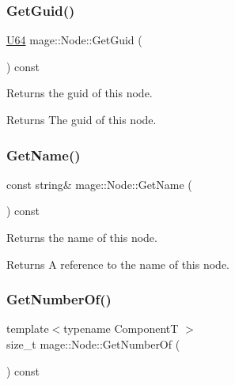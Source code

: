 \subsubsection{\texorpdfstring{Get\+Guid()}{GetGuid()}}
{\footnotesize\ttfamily \hyperlink{namespacemage_a6672cf3c861707ce4a3235a3eb43941d}{U64} mage\+::\+Node\+::\+Get\+Guid (\begin{DoxyParamCaption}{ }\end{DoxyParamCaption}) const\hspace{0.3cm}{\ttfamily [noexcept]}}

Returns the guid of this node.

\begin{DoxyReturn}{Returns}
The guid of this node. 
\end{DoxyReturn}
\hypertarget{classmage_1_1_node_a206e7c7ef80a0561b31ebbb9d05c98a0}{}\label{classmage_1_1_node_a206e7c7ef80a0561b31ebbb9d05c98a0} 
\subsubsection{\texorpdfstring{Get\+Name()}{GetName()}}
{\footnotesize\ttfamily const string\& mage\+::\+Node\+::\+Get\+Name (\begin{DoxyParamCaption}{ }\end{DoxyParamCaption}) const\hspace{0.3cm}{\ttfamily [noexcept]}}

Returns the name of this node.

\begin{DoxyReturn}{Returns}
A reference to the name of this node. 
\end{DoxyReturn}
\hypertarget{classmage_1_1_node_a0cd486de1639d5af2618ba913124fbe6}{}\label{classmage_1_1_node_a0cd486de1639d5af2618ba913124fbe6} 
\subsubsection{\texorpdfstring{Get\+Number\+Of()}{GetNumberOf()}}
{\footnotesize\ttfamily template$<$typename ComponentT $>$ \\
size\+\_\+t mage\+::\+Node\+::\+Get\+Number\+Of (\begin{DoxyParamCaption}{ }\end{DoxyParamCaption}) const\hspace{0.3cm}{\ttfamily [noexcept]}}

